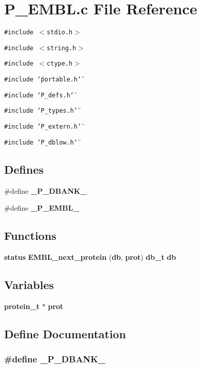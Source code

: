 \section{P\_\-EMBL.c File Reference}
\label{P__EMBL_8c}
{\tt \#include $<$stdio.h$>$}\par
{\tt \#include $<$string.h$>$}\par
{\tt \#include $<$ctype.h$>$}\par
{\tt \#include \char`\"{}portable.h\char`\"{}}\par
{\tt \#include \char`\"{}P\_\-defs.h\char`\"{}}\par
{\tt \#include \char`\"{}P\_\-types.h\char`\"{}}\par
{\tt \#include \char`\"{}P\_\-extern.h\char`\"{}}\par
{\tt \#include \char`\"{}P\_\-dblow.h\char`\"{}}\par
\subsection*{Defines}
\begin{CompactItemize}
\item 
\#define {\bf \_\-P\_\-DBANK\_\-}
\item 
\#define {\bf \_\-P\_\-EMBL\_\-}
\end{CompactItemize}
\subsection*{Functions}
\begin{CompactItemize}
\item 
{\bf status} {\bf EMBL\_\-next\_\-protein} ({\bf db}, {\bf prot}) {\bf db\_\-t} {\bf db}
\end{CompactItemize}
\subsection*{Variables}
\begin{CompactItemize}
\item 
{\bf protein\_\-t} $\ast$ {\bf prot}
\end{CompactItemize}


\subsection{Define Documentation}
\subsubsection{\setlength{\rightskip}{0pt plus 5cm}\#define \_\-P\_\-DBANK\_\-}\label{P__EMBL_8c_a0}


